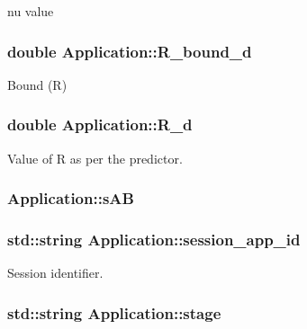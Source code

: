 nu value 

\hypertarget{classApplication_a32da2e06513ef910601d75eb89bb528b}{
\subsubsection[{R\-\_\-bound\-\_\-d}]{\setlength{\rightskip}{0pt plus 5cm}double Application\-::\-R\-\_\-bound\-\_\-d}}\label{classApplication_a32da2e06513ef910601d75eb89bb528b}


Bound (R) 

\hypertarget{classApplication_a374d43f68ae27aaed98278e8152a434c}{
\subsubsection[{R\-\_\-d}]{\setlength{\rightskip}{0pt plus 5cm}double Application\-::\-R\-\_\-d}}\label{classApplication_a374d43f68ae27aaed98278e8152a434c}


Value of R as per the predictor. 

\hypertarget{classApplication_a6bbd698f2df7c4cedb9fb46fce23dbfe}{
\subsubsection[{s\-A\-B}]{ Application\-::s\-A\-B}}\label{classApplication_a6bbd698f2df7c4cedb9fb46fce23dbfe}
\hypertarget{classApplication_a5e28ffadb86925ecae57ab18c0085d90}{
\subsubsection[{session\-\_\-app\-\_\-id}]{\setlength{\rightskip}{0pt plus 5cm}std\-::string Application\-::session\-\_\-app\-\_\-id}}\label{classApplication_a5e28ffadb86925ecae57ab18c0085d90}


Session identifier. 

\hypertarget{classApplication_adb1cba2c06695bfdf81482dfba449d5b}{
\subsubsection[{stage}]{\setlength{\rightskip}{0pt plus 5cm}std\-::string Application\-::stage}}\label{classApplication_adb1cba2c06695bfdf81482dfba449d5b}


